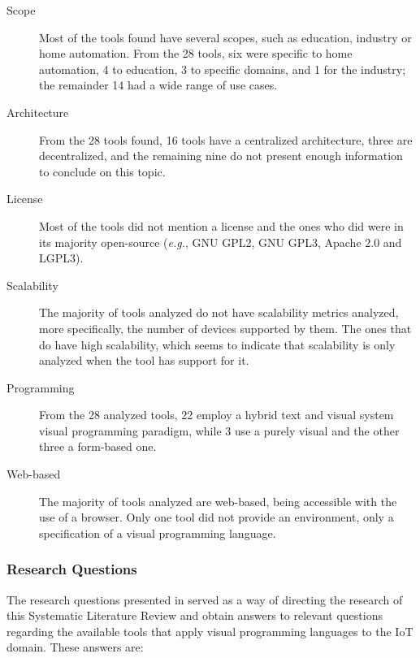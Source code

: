\begin{description}
    \item [Scope] Most of the tools found have several scopes, such as education, industry or home automation. From the 28 tools, six were specific to home automation, 4 to education, 3 to specific domains, and 1 for the industry; the remainder 14 had a wide range of use cases.
    \item [Architecture] From the 28 tools found, 16 tools have a centralized architecture, three are decentralized, and the remaining nine do not present enough information to conclude on this topic.
    \item [License] Most of the tools did not mention a license and the ones who did were in its majority open-source (\emph{e.g.}, GNU GPL2, GNU GPL3, Apache 2.0 and LGPL3). 
    \item [Scalability] The majority of tools analyzed do not have scalability metrics analyzed, more specifically, the number of devices supported by them. The ones that do have high scalability, which seems to indicate that scalability is only analyzed when the tool has support for it.
    \item [Programming] From the 28 analyzed tools, 22 employ a hybrid text and visual system visual programming paradigm, while 3 use a purely visual and the other three a form-based one. 
    \item [Web-based] The majority of tools analyzed are web-based, being accessible with the use of a browser. Only one tool did not provide an environment, only a specification of a visual programming language.
\end{description}

\subsubsection{Research Questions}\label{sec:answer_slr_research_questions}

The research questions presented in  served as a way of directing the research of this Systematic Literature Review and obtain answers to relevant questions regarding the available tools that apply visual programming languages to the IoT domain. These answers are:


